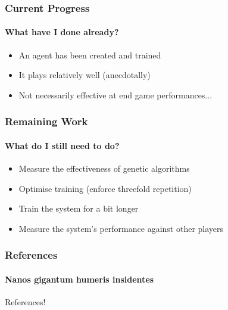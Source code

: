 \documentclass{beamer}
\begin{document}
\begin{frame}
	\frametitle{Current Progress}
	\framesubtitle{What have I done already?}

	\begin{itemize}
		\item An agent has been created and trained
		\item It plays relatively well (anecdotally)
		\item Not necessarily effective at end game performances...
	\end{itemize}
\end{frame}

\begin{frame}
	\frametitle{Remaining Work}
	\framesubtitle{What do I still need to do?}
	\begin{itemize}
		\item Measure the effectiveness of genetic algorithms
		\item Optimise training (enforce threefold repetition)
		\item Train the system for a bit longer
		\item Measure the system's performance against other players
	\end{itemize}
\end{frame}

\begin{frame}
	\frametitle{References}
	\framesubtitle{Nanos gigantum humeris insidentes}
	References!
\end{frame}
\end{document}
